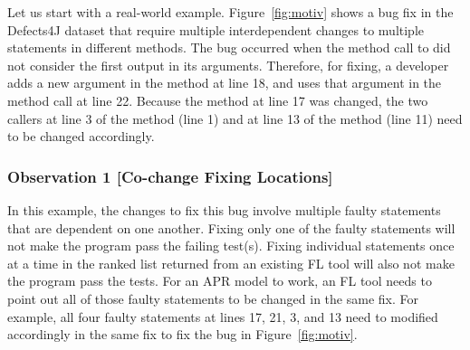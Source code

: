 Let us start with a real-world example.
Figure~\ref{fig:motiv} shows a bug fix in the Defects4J dataset that
require multiple interdependent changes to multiple statements in
different methods. The bug occurred when the method call to
 did not consider the first output in its
arguments. Therefore, for fixing, a developer adds a new argument in
the method  at line 18, and uses that argument in the
method call  at line
22. Because the method  at line 17 was changed, the two
callers at line 3 of the method  (line 1) and at line
13 of the method  (line 11) need to be changed
accordingly.






\subsubsection{Observation 1 [Co-change Fixing Locations]}
In this example, the changes to fix this bug involve multiple faulty
statements that are dependent on one another. Fixing only one of the
faulty statements will not make the program pass the failing
test(s). Fixing individual statements once at a time in the ranked
list returned from an existing FL tool will also not make the program
pass the tests. For an APR model to work, an FL tool needs to point
out all of those faulty statements to be changed in the same fix.  For
example, all four faulty statements at lines 17, 21, 3, and 13 need to
modified accordingly in the same fix to fix the bug in
Figure~\ref{fig:motiv}.

